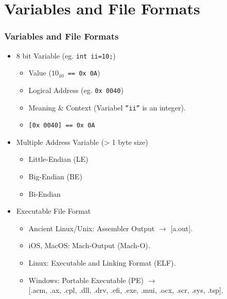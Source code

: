 \documentclass[xcolor=table, notheorems, hyperref={pdfpagelabels=false}]{beamer}
\begin{document}
\section{Variables and File Formats}
\begin{frame}
\frametitle{Variables and File Formats}
\begin{itemize}
\item 8 bit Variable (eg. \texttt{int ii=10;})
\begin{itemize}
\item Value  (\texttt{$10_{10}$ == 0x 0A})
\item Logical Address (eg. \texttt{0x 0040})
\item Meaning \& Context (Variabel \texttt{''ii''} is an integer).
\item \texttt{[0x 0040] == 0x 0A}
\end{itemize}
\item Multiple Address Variable (> 1 byte size)
\begin{itemize}
\item Little-Endian (LE)
\item Big-Endian (BE)
\item Bi-Endian
\end{itemize}
\item Executable File Format
\begin{itemize}
\item Ancient Linux/Unix: Assembler Output $\rightarrow$ [a.out].
\item iOS, MacOS: Mach-Output (Mach-O).
\item Linux: Executable and Linking Format (ELF).
\item Windows: Portable Executable (PE) $\rightarrow$ \\[0mm]
      [.acm, .ax, .cpl, .dll, .drv, .efi, .exe, .mui, .ocx, .scr, .sys, .tsp].
\end{itemize}
\end{itemize}
\end{frame}

\end{document}
